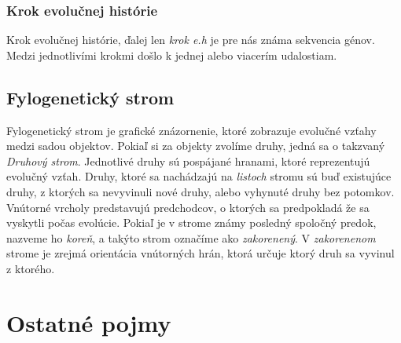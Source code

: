 \subsubsection{Krok evolučnej histórie}
Krok evolučnej histórie, ďalej len \emph{krok e.h} je pre nás známa sekvencia génov. 
Medzi jednotlivími krokmi došlo k jednej alebo viacerím udalostiam. 

\subsection{Fylogenetický strom}
Fylogenetický strom je grafické znázornenie, ktoré zobrazuje evolučné vzťahy medzi sadou objektov. Pokiaľ si za objekty zvolíme druhy, jedná sa o takzvaný \emph{Druhový strom}.
Jednotlivé druhy sú pospájané hranami, ktoré reprezentujú evolučný vzťah.
\newline 
Druhy, ktoré sa nachádzajú na \emph{listoch} stromu sú buď existujúce druhy, z ktorých sa nevyvinuli nové druhy, alebo vyhynuté druhy bez potomkov.  
\newline
Vnútorné vrcholy predstavujú predchodcov, o ktorých sa predpokladá že sa vyskytli počas evolúcie.
\newline
Pokiaľ je v strome známy posledný spoločný predok, nazveme ho \emph{koreň}, a takýto strom označíme ako \emph{zakorenený}.
\newline
V \emph{zakorenenom} strome je zrejmá orientácia vnútorných hrán, ktorá určuje ktorý druh sa vyvinul z ktorého.
\section{Ostatné pojmy}
